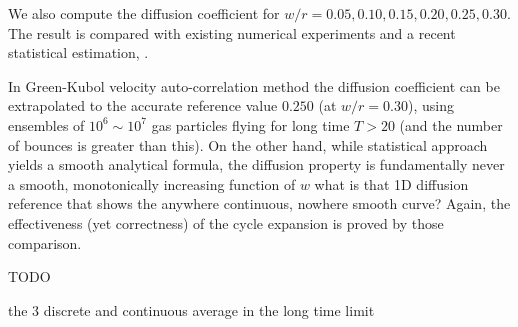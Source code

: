 We also compute the diffusion coefficient for $w/r = 0.05, 0.10, 0.15,
0.20, 0.25, 0.30$. The result is compared with existing 
numerical experiments and a recent statistical estimation, 
.

In Green-Kubol velocity auto-correlation method the  diffusion
coefficient can be extrapolated to the accurate reference value
$0.250$ (at $w/r=0.30$), using ensembles of $10^6\sim10^7$ gas
particles flying for long time $T>20$ (and the number of bounces is
greater than this). On the other hand, while statistical
approach yields a smooth analytical formula, the
diffusion property is fundamentally never a smooth, monotonically
increasing function of $w$  {what is that 1D diffusion
reference that shows the anywhere continuous, nowhere smooth curve?}
Again, the effectiveness (yet correctness) of the cycle expansion is
proved by those comparison.

TODO

the 3 discrete and continuous average in the long time limit